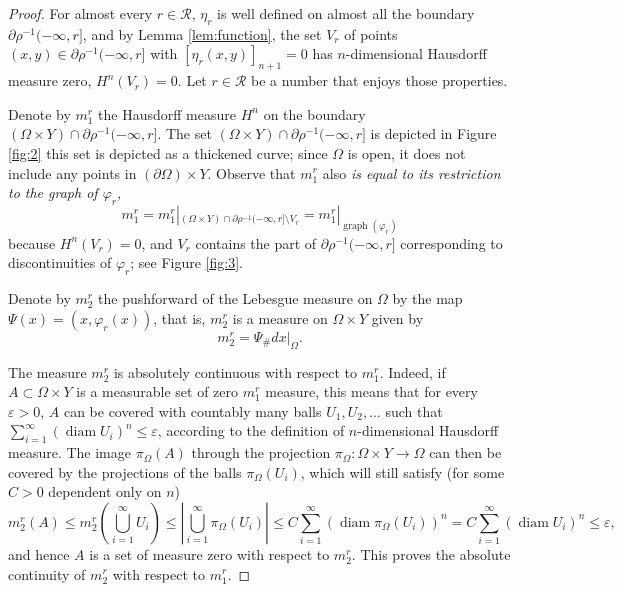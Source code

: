 \documentclass[10pt,a4paper]{amsart}
\newcommand{\proj}{\pi}
\newcommand{\projX}{\proj_{\Omega}}
\begin{document}
 \begin{proof}
 For almost every $r\in {\mathcal R}$, $\eta_r$ is well defined on almost all the boundary $\partial\rho^{-1}(-\infty,r]$, and by Lemma \ref{lem:function}, the set $V_r$ of points $(x,y)\in\partial\rho^{-1}(-\infty,r]$ with $[\eta_r(x,y)]_{n+1}=0$ has $n$-dimensional Hausdorff measure zero, $H^n(V_r)=0$. Let $r\in {\mathcal R}$ be a number that enjoys those properties.
 
 Denote by $m_1^r$ the Hausdorff measure $H^n$ on the boundary $(\Omega\times Y)\cap\partial \rho^{-1}(-\infty,r]$. The set $(\Omega\times Y)\cap\partial \rho^{-1}(-\infty,r]$ is depicted in Figure \ref{fig:2} this set is depicted as a thickened curve; since $\Omega$ is open, it does not include any points in $(\partial\Omega)\times Y$.
 Observe that $m_1^r$ also \emph{is equal to its restriction to the graph of $\varphi_r$,}
 \begin{equation}\label{eq:restriction}
  m^r_1=m^r_1|_{(\Omega\times Y)\cap\partial \rho^{-1}(-\infty,r]\setminus V_r}=m^r_1|_{\operatorname{graph}(\varphi_r)}
 \end{equation}
 because $H^n(V_r)=0$, and $V_r$ contains the part of $\partial\rho^{-1}(-\infty,r]$ corresponding to discontinuities of $\varphi_r$; see Figure \ref{fig:3}. 
 
 Denote by $m_2^r$ the pushforward of 
{the} Lebesgue measure on $\Omega$ by the map $\Psi(x)=(x,\varphi_r(x))$, that is, $m_2^r$ is a measure on $\Omega \times Y$ given by
 \[m_2^r=\Psi_{\#}dx|_{\Omega}.\] 
 
 The measure $m_2^r$ is absolutely continuous with respect to $m_1^r$. Indeed, if $A\subset\Omega\times Y$ is a measurable set of zero $m_1^r$ measure, this means that for every $\varepsilon>0$, $A$ can be covered with countably many balls $U_1,U_2,\dots$ such that $\sum_{i=1}^\infty(\operatorname{diam} U_i)^n\leq \varepsilon$, according to the definition of $n$-dimensional Hausdorff measure. The image $\projX{}(A)$ through the projection $\projX{}\colon\Omega\times Y\to\Omega$ can then be covered by the projections of the balls $\projX{}(U_i)$, which will still satisfy (for some $C>0$ dependent only on $n$)
 \[m^r_2(A)\leq m^r_2({\textstyle\bigcup_{i=1}^\infty U_i})\leq |\textstyle\bigcup_{i=1}^\infty \projX{}(U_i)|\leq C\sum_{i=1}^\infty(\operatorname{diam}\projX{}(U_i))^n=C\sum_{i=1}^\infty(\operatorname{diam}U_i)^n\leq \varepsilon,\] 
 and hence $A$ is a set of measure zero with respect to $m_2^r$. This proves the absolute continuity of $m_2^r$ with respect to $m_1^r$.
 

\end{proof}
\end{document}
